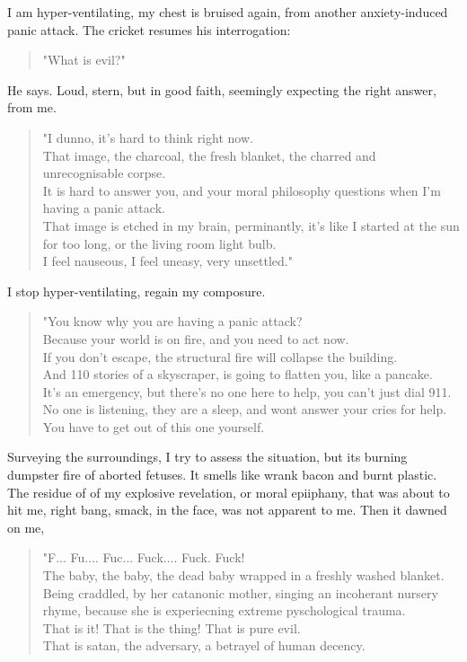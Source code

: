 \documentclass[16pt,openany,oneside]{book}
\begin{document}
I am hyper-ventilating, my chest is bruised again, from another anxiety-induced panic attack.
The cricket resumes his interrogation:
\begin{quote}
     "What is evil?"
\end{quote}    
He says. Loud, stern, but in good faith, seemingly expecting the right answer, from me.
\begin{quote}
     "I dunno, it's hard to think right now.
    \\
      That image, the charcoal, the fresh blanket, the charred and unrecognisable corpse.
    \\
      It is hard to answer you, and your moral philosophy questions when I'm having a panic attack.
    \\
      That image is etched in my brain, perminantly, it's like I started at the sun for too long, or the living room light bulb.
    \\
      I feel nauseous, I feel uneasy, very unsettled."
\end{quote}      
I stop hyper-ventilating, regain my composure.
\begin{quote}
     "You know why you are having a panic attack?
    \\
      Because your world is on fire, and you need to act now.
    \\
      If you don't escape, the structural fire will collapse the building.
    \\
      And 110 stories of a skyscraper, is going to flatten you, like a pancake.
    \\
      It's an emergency, but there's no one here to help, you can't just dial 911.
    \\
      No one is listening, they are a sleep, and wont answer your cries for help.
    \\
      You have to get out of this one yourself.
\end{quote}      
Surveying the surroundings, I try to assess the situation, but its burning dumpster fire of aborted fetuses. It smells like wrank bacon and burnt plastic.
The residue of of my explosive revelation, or moral epiiphany, that was about to hit me, right bang, smack, in the face, was not apparent to me.
Then it dawned on me,
\begin{quote}
     "F... Fu.... Fuc... Fuck.... Fuck. Fuck!
    \\
      The baby, the baby, the dead baby wrapped in a freshly washed blanket.
    \\
      Being craddled, by her catanonic mother, singing an incoherant nursery rhyme, because she is experiecning extreme pyschological trauma.
    \\
      That is it! That is the thing! That is pure evil. 
    \\
      That is satan, the adversary, a betrayel of human decency.
\end{quote}     
\end{document}
